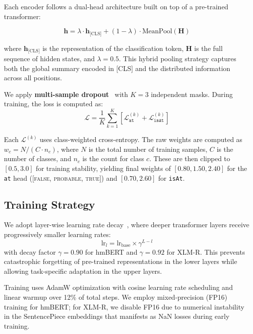 \documentclass[11pt,a4paper]{article}
\begin{document}
Each encoder follows a dual-head architecture built on top of a pre-trained transformer:

\begin{equation}
    \mathbf{h} = \lambda \cdot \mathbf{h}_{\text{[CLS]}} + (1-\lambda) \cdot \text{MeanPool}(\mathbf{H})
\end{equation}

where $\mathbf{h}_{\text{[CLS]}}$ is the representation of the classification token, $\mathbf{H}$ is the full sequence of hidden states, and $\lambda=0.5$. This hybrid pooling strategy captures both the global summary encoded in [CLS] and the distributed information across all positions.

We apply \textbf{multi-sample dropout}~\cite{inoue2019} with $K=3$ independent masks. During training, the loss is computed as:
\begin{equation}
    \mathcal{L} = \frac{1}{K}\sum_{k=1}^{K}\left[\mathcal{L}_{\texttt{at}}^{(k)} + \mathcal{L}_{\texttt{isAt}}^{(k)}\right]
\end{equation}

Each $\mathcal{L}^{(k)}$ uses class-weighted cross-entropy. The raw weights are computed as $w_c = N / (C \cdot n_c)$, where $N$ is the total number of training samples, $C$ is the number of classes, and $n_c$ is the count for class $c$. These are then clipped to $[0.5, 3.0]$ for training stability, yielding final weights of $[0.80, 1.50, 2.40]$ for the \texttt{at} head ([\textsc{false}, \textsc{probable}, \textsc{true}]) and $[0.70, 2.60]$ for \texttt{isAt}.

\subsection{Training Strategy}

We adopt layer-wise learning rate decay~\cite{howard2018}, where deeper transformer layers receive progressively smaller learning rates:
\begin{equation}
    \text{lr}_l = \text{lr}_{\text{base}} \times \gamma^{L-l}
\end{equation}
with decay factor $\gamma=0.90$ for hmBERT and $\gamma=0.92$ for XLM-R. This prevents catastrophic forgetting of pre-trained representations in the lower layers while allowing task-specific adaptation in the upper layers.

Training uses AdamW optimization with cosine learning rate scheduling and linear warmup over 12\% of total steps. We employ mixed-precision (FP16) training for hmBERT; for XLM-R, we disable FP16 due to numerical instability in the SentencePiece embeddings that manifests as NaN losses during early training.
\end{document}
